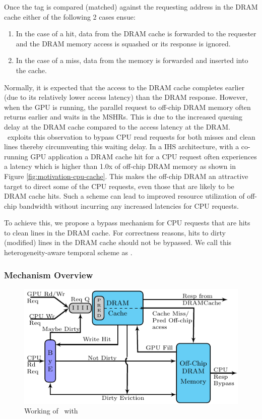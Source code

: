 Once the tag is compared (matched) against the requesting address in the DRAM cache either of the following 2 cases ensue: 
\begin{enumerate}[label=(\alph*)]
	\item In the case of a hit, data from the DRAM cache is forwarded to the requester and the DRAM memory access is squashed or its response is ignored. 
	\item In the case of a miss, data from the memory is forwarded and inserted into the cache.
\end{enumerate}
Normally, it is expected that the access to the DRAM cache completes earlier (due to its relatively lower access latency) than the DRAM response. However, when the GPU is running, the parallel request to off-chip DRAM memory often returns earlier and waits in the MSHRs. This is due to the increased queuing delay at the DRAM cache compared to the access latency at the DRAM. \cachename\ exploits this observation to bypass CPU read requests for both misses and clean lines thereby circumventing this waiting delay.
In a IHS architecture, with a co-running GPU application a DRAM cache hit for a CPU request often experiences a latency which is higher than 1.0x of off-chip DRAM memory as shown in Figure \ref{fig:motivation-cpu-cache}. 
This makes the off-chip DRAM an attractive target to direct some of the CPU requests, even those that are likely to be DRAM cache hits. Such a scheme can lead to improved resource utilization of off-chip bandwidth without incurring any increased latencies for CPU requests.
\par To achieve this, we propose a bypass mechanism for CPU requests that are hits to clean lines in the DRAM cache. For correctness reasons, hits to dirty (modified) lines in the DRAM cache should not be bypassed. We call this heterogeneity-aware temporal scheme as \bypassname.


\subsubsection{Mechanism Overview}

\begin{figure}[htb]
	\centering
	\includegraphics[scale=1.5]{figures/bloom}	
	\caption{Working of \cachename\ with \bypassname}
	\label{fig:bye}
\end{figure}

